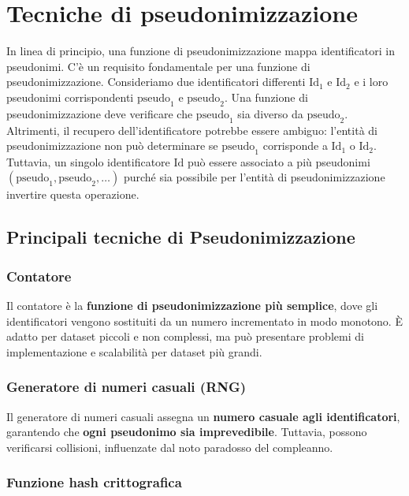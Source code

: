 \chapter{Tecniche di pseudonimizzazione}

In linea di principio, una funzione di pseudonimizzazione mappa identificatori in pseudonimi. C'è un requisito fondamentale per una funzione di pseudonimizzazione. Consideriamo due identificatori differenti \( \text{Id}_1 \) e \( \text{Id}_2 \) e i loro pseudonimi corrispondenti \( \text{pseudo}_1 \) e \( \text{pseudo}_2 \). Una funzione di pseudonimizzazione deve verificare che \( \text{pseudo}_1 \) sia diverso da \( \text{pseudo}_2 \). Altrimenti, il recupero dell'identificatore potrebbe essere ambiguo: l'entità di pseudonimizzazione non può determinare se \( \text{pseudo}_1 \) corrisponde a \( \text{Id}_1 \) o \( \text{Id}_2 \). Tuttavia, un singolo identificatore \( \text{Id} \) può essere associato a più pseudonimi \( (\text{pseudo}_1, \text{pseudo}_2, \ldots) \) purché sia possibile per l'entità di pseudonimizzazione invertire questa operazione.

\section{Principali tecniche di Pseudonimizzazione}

\subsection{Contatore}

Il contatore è la\textbf{ funzione di pseudonimizzazione più semplice}, dove gli identificatori vengono sostituiti da un numero incrementato in modo monotono. È adatto per dataset piccoli e non complessi, ma può presentare problemi di implementazione e scalabilità per dataset più grandi.

\subsection{Generatore di numeri casuali (RNG)}

Il generatore di numeri casuali assegna un \textbf{numero casuale agli identificatori}, garantendo che \textbf{ogni pseudonimo sia imprevedibile}. Tuttavia, possono verificarsi collisioni, influenzate dal noto paradosso del compleanno.

\subsection{Funzione hash crittografica}

